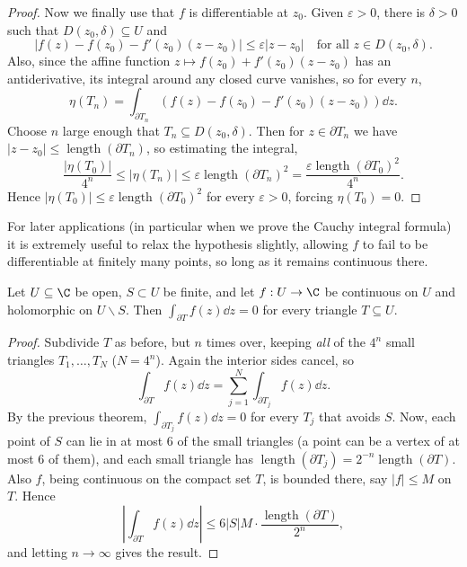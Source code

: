 \begin{proof}
    Now we finally use that $f$ is differentiable at $z_0$. Given $\varepsilon > 0$, there is $\delta > 0$ such that $D(z_0, \delta) \subseteq U$ and
    $$
    |f(z) - f(z_0) - f'(z_0)(z - z_0)| \leq \varepsilon|z - z_0| \quad \text{for all } z \in D(z_0, \delta).
    $$
    Also, since the affine function $z \mapsto f(z_0) + f'(z_0)(z - z_0)$ has an antiderivative, its integral around any closed curve vanishes, so for every $n$,
    $$
    \eta(T_n) = \int_{\partial T_n} \left(f(z) - f(z_0) - f'(z_0)(z - z_0)\right) \dd z.
    $$
    Choose $n$ large enough that $T_n \subseteq D(z_0, \delta)$. Then for $z \in \partial T_n$ we have $|z - z_0| \leq \operatorname{length}(\partial T_n)$, so estimating the integral,
    $$
    \frac{|\eta(T_0)|}{4^n} \leq |\eta(T_n)| \leq \varepsilon \operatorname{length}(\partial T_n)^2 = \frac{\varepsilon \operatorname{length}(\partial T_0)^2}{4^n}.
    $$
    Hence $|\eta(T_0)| \leq \varepsilon \operatorname{length}(\partial T_0)^2$ for every $\varepsilon > 0$, forcing $\eta(T_0) = 0$.
\end{proof}

For later applications (in particular when we prove the Cauchy integral formula) it is extremely useful to relax the hypothesis slightly, allowing $f$ to fail to be differentiable at finitely many points, so long as it remains continuous there.

\begin{theorem}
    Let $U \subseteq \C$ be open, $S \subset U$ be finite, and let $f: U \rightarrow \C$ be continuous on $U$ and holomorphic on $U \backslash S$. Then $\int_{\partial T} f(z) \dd z = 0$ for every triangle $T \subseteq U$.
\end{theorem}
\begin{proof}
    Subdivide $T$ as before, but $n$ times over, keeping \emph{all} of the $4^n$ small triangles $T_1, \dots, T_N$ ($N = 4^n$). Again the interior sides cancel, so
    $$
    \int_{\partial T} f(z) \dd z = \sum_{j = 1}^{N} \int_{\partial T_j} f(z) \dd z.
    $$
    By the previous theorem, $\int_{\partial T_j} f(z) \dd z = 0$ for every $T_j$ that avoids $S$. Now, each point of $S$ can lie in at most $6$ of the small triangles (a point can be a vertex of at most $6$ of them), and each small triangle has $\operatorname{length}(\partial T_j) = 2^{-n}\operatorname{length}(\partial T)$. Also $f$, being continuous on the compact set $T$, is bounded there, say $|f| \leq M$ on $T$. Hence
    $$
    \left|\int_{\partial T} f(z) \dd z\right| \leq 6 |S| M \cdot \frac{\operatorname{length}(\partial T)}{2^n},
    $$
    and letting $n \rightarrow \infty$ gives the result.
\end{proof}

